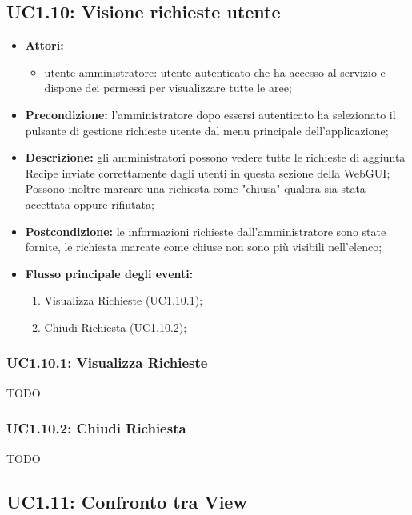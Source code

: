 \pagebreak

\subsection{UC1.10: Visione richieste utente}

\begin{itemize}
	\item \textbf{Attori:}
	\begin{itemize}
		\item utente amministratore: utente autenticato che ha accesso al servizio e dispone dei permessi per visualizzare tutte le aree;
	\end{itemize}
	\item \textbf{Precondizione:} l'amministratore dopo essersi autenticato ha selezionato il pulsante di gestione richieste utente dal menu principale dell'applicazione;
	\item \textbf{Descrizione:} gli amministratori possono vedere tutte le richieste di aggiunta Recipe inviate correttamente dagli utenti in questa sezione della WebGUI; Possono inoltre marcare una richiesta come "chiusa" qualora sia stata accettata oppure rifiutata;
	\item \textbf{Postcondizione:} le informazioni richieste dall'amministratore sono state fornite, le richiesta marcate come chiuse non sono più visibili nell'elenco; 
	\item \textbf{Flusso principale degli eventi:}
	\begin{enumerate}
		\item Visualizza Richieste (UC1.10.1);
		\item Chiudi Richiesta (UC1.10.2);
	\end{enumerate}
\end{itemize}

\subsubsection{UC1.10.1: Visualizza Richieste}	TODO
\subsubsection{UC1.10.2: Chiudi Richiesta}	TODO



\pagebreak

\subsection{UC1.11: Confronto tra View}


